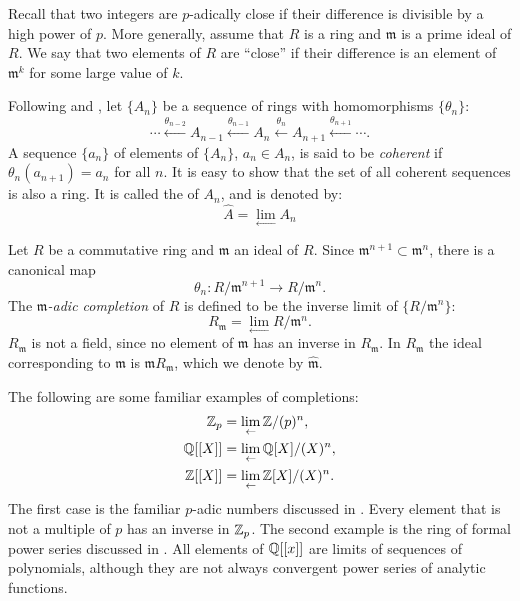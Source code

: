 Recall that two integers are $p$-adically close if their difference is
divisible by a high power of $p$.  More generally, assume that
$R$ is a ring and $\mathfrak{m}$ is a prime ideal of $R$.  We say
that two elements of $R$ are ``close'' if their difference is an
element of $\mathfrak{m}^k$ for some large value of $k$.

Following {\Atiyah} and {\MacDonald} \cite{Atiyah:MacDonald}, let
$\{A_n\}$ be a sequence of rings with homomorphisms $\{ \theta_n \}$:
\[
\cdots \xleftarrow{\theta_{n-2}} A_{n-1} \xleftarrow{\theta_{n-1}} A_n
\xleftarrow{\theta_{n}} A_{n+1} \xleftarrow{\theta_{n+1}} \cdots.
\]
A sequence $\{ a_n\}$ of elements of $\{A_n\}$, $a_n \in A_n$, is said
to be {\em coherent} if $\theta_n(a_{n+1}) =
a_n$ for all $n$.  It is easy to show that the set of all coherent
sequences is also a ring.  It is called the  of
$A_n$, and is denoted by:
\[
\hat{A} = \lim_{\leftarrow} A_n
\]

Let $R$ be a commutative ring and $\mathfrak{m}$ an ideal of $R$.  Since
$\mathfrak{m}^{n+1} \subset \mathfrak{m}^n$, there is a canonical map
\[
\theta_n : R/\mathfrak{m}^{n+1} \rightarrow R/\mathfrak{m}^n.
\]
The {\em $\mathfrak{m}$-adic completion}  of $R$ is defined to be
the inverse limit of $\{ R/\mathfrak{m}^n \}$:
\[
R_{\mathfrak{m}} = \lim_{\leftarrow} R/\mathfrak{m}^n.
\]
$R_\mathfrak{m}$ is not a field, since no element of $\mathfrak{m}$
has an inverse in $R_\mathfrak{m}$.  In $R_\mathfrak{m}$ the ideal
corresponding to $\mathfrak{m}$ is $\mathfrak{m} R_\mathfrak{m}$,
which we denote by $\hat{\mathfrak{m}}$.

The following are some familiar examples of completions:
\[
\begin{aligned}
\mathbb{Z}_p & = \displaystyle \lim_{\leftarrow} \mathbb{Z}/(p)^n, \\
\mathbb{Q}[[X]] & = \displaystyle \lim_{\leftarrow} \mathbb{Q}[X]/(X)^n, \\
\mathbb{Z}[[X]] & = \displaystyle \lim_{\leftarrow} \mathbb{Z}[X]/(X)^n.
\end{aligned}
\]
The first case is the familiar $p$-adic numbers discussed in .
Every element that is not a multiple of $p$ has an inverse in $\mathbb{Z}_p$.
The second example is the ring of formal power series discussed in
.  All elements of $\mathbb{Q}[[x]]$ are limits of
sequences of polynomials, although they are not always convergent
power series of analytic functions.

